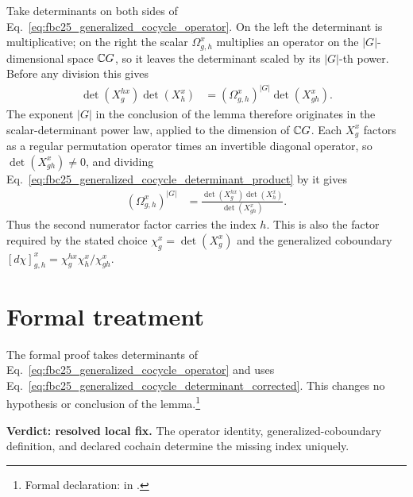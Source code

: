 \documentclass{article}
\begin{document}
Take determinants on both sides of
Eq.~\ref{eq:fbc25_generalized_cocycle_operator}. On the left the determinant
is multiplicative; on the right the scalar $\Omega^x_{g,h}$ multiplies an
operator on the $|G|$-dimensional space $\mathbb{C} G$, so it leaves the determinant
scaled by its $|G|$-th power. Before any division this gives
\begin{align}
    \det(X^{h x}_g)\det(X^x_h)
        &=\left(\Omega^x_{g,h}\right)^{|G|}\det(X^x_{gh}).
    \label{eq:fbc25_generalized_cocycle_determinant_product}
\end{align}
The exponent $|G|$ in the conclusion of the lemma therefore originates in the
scalar-determinant power law, applied to the dimension of $\mathbb{C} G$. Each
$X^x_g$ factors as a regular permutation operator times an invertible diagonal
operator, so $\det(X^x_{gh})\ne0$, and dividing
Eq.~\ref{eq:fbc25_generalized_cocycle_determinant_product} by it gives
\begin{align}
    \left(\Omega^x_{g,h}\right)^{|G|}
        &=\frac{\det(X^{h x}_g)\det(X^x_h)}{\det(X^x_{gh})}.
    \label{eq:fbc25_generalized_cocycle_determinant_corrected}
\end{align}
Thus the second numerator factor carries the index $h$. This is also the factor
required by the stated choice $\chi^x_g=\det(X^x_g)$ and the generalized
coboundary $[d\chi]^x_{g,h}=\chi^{h x}_g\chi^x_h/\chi^x_{gh}$.

\section{Formal treatment}

The formal proof takes determinants of
Eq.~\ref{eq:fbc25_generalized_cocycle_operator} and uses
Eq.~\ref{eq:fbc25_generalized_cocycle_determinant_corrected}.
This changes no hypothesis or conclusion of the lemma.\footnote{Formal
declaration:  in
.}

\textbf{Verdict: resolved local fix.}
The operator identity, generalized-coboundary definition, and declared
cochain determine the missing index uniquely.



\end{document}
